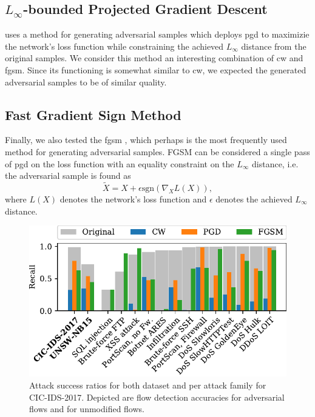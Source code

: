 \documentclass[conference]{IEEEtran}
\begin{document}
\subsection{$L_\infty$-bounded Projected Gradient Descent}
\cite{madry_towards_2018} uses a method for generating adversarial samples which deploys \gls{pgd}  to maximizie the network's loss function while constraining the achieved $L_\infty$ distance from the original samples.
We consider this method an interesting combination of \gls{cw} and \gls{fgsm}.
Since its functioning is somewhat similar to \gls{cw}, we expected the generated adversarial samples to be of similar quality.

\subsection{Fast Gradient Sign Method}
Finally, we also tested the \gls{fgsm} %
 \cite{goodfellow_explaining_2015}, which perhaps is the most frequently used method for generating adversarial samples. FGSM can be considered a single pass of \gls{pgd} on the loss function with an equality constraint on the $L_\infty$ distance, i.e. the adversarial sample is found as
\begin{equation}
\tilde X = X + \epsilon \text{sgn}( \nabla_X L(X)),
\end{equation}
where $L(X)$ denotes the network's loss function and $\epsilon$ denotes the achieved $L_\infty$ distance.

\begin{figure}[t]
\includegraphics[width=\columnwidth]{../plots/adv_comparison/adv_comparison_17.pdf}
\caption{Attack success ratios for both dataset and per attack family for CIC-IDS-2017. Depicted are flow detection accuracies for adversarial flows and for unmodified flows.}
\label{fig:adv_per_family}
\end{figure}
\end{document}
